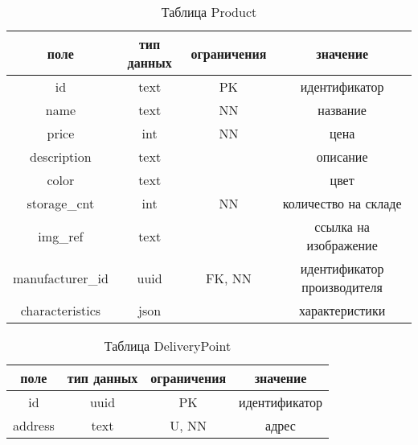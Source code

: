 \begin{table}[H]
	\begin{center}
		\caption{Таблица Product}
		\label{tbl:prod}
		\begin{tabular}{|c|c|c|c|}
			\hline
			поле & тип данных & ограничения & значение \\
			\hline
			id & text  & PK & идентификатор \\
			\hline
			name & text & NN & название \\
			\hline
			price & int & NN & цена \\
			\hline
			description & text & & описание \\
			\hline
			color & text & & цвет \\
			\hline
			storage\_cnt & int & NN & количество на складе \\
			\hline
			img\_ref & text & & ссылка на изображение \\
			\hline
			manufacturer\_id & uuid & FK, NN & идентификатор производителя \\
			\hline
			characteristics & json & & характеристики \\
			\hline
		\end{tabular}
	\end{center}	
\end{table}
\begin{table}[H]
	\begin{center}
		\caption{Таблица DeliveryPoint}
		\label{tbl:dp}
		\begin{tabular}{|c|c|c|c|}
			\hline
			поле & тип данных & ограничения & значение \\
			\hline
			id & uuid  & PK & идентификатор \\
			\hline
			address & text & U, NN & адрес \\
			\hline
		\end{tabular}
	\end{center}	
\end{table}

